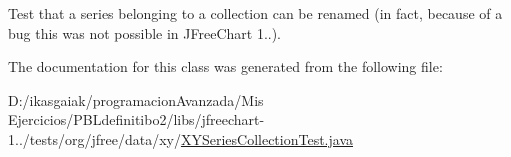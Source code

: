 Test that a series belonging to a collection can be renamed (in fact, because of a bug this was not possible in J\+Free\+Chart 1..). 

The documentation for this class was generated from the following file\+:\begin{DoxyCompactItemize}
\item 
D\+:/ikasgaiak/programacion\+Avanzada/\+Mis Ejercicios/\+P\+B\+Ldefinitibo2/libs/jfreechart-\/1../tests/org/jfree/data/xy/\mbox{\hyperlink{_x_y_series_collection_test_8java}{X\+Y\+Series\+Collection\+Test.\+java}}\end{DoxyCompactItemize}
